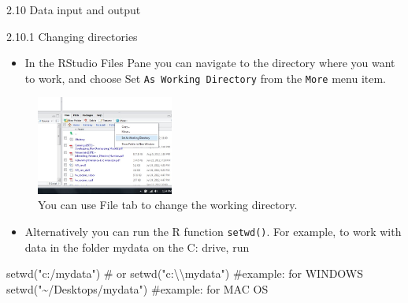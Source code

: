 \documentclass[
  9pt,
  a4paper,
  ignorenonframetext,
  notheorems]{beamer}
\newenvironment{Shaded}{\begin{snugshade}}{\end{snugshade}}
\newcommand{\CommentTok}[1]{\textcolor[rgb]{0.37,0.37,0.37}{#1}}
\newcommand{\FunctionTok}[1]{\textcolor[rgb]{0.28,0.35,0.67}{#1}}
\newcommand{\NormalTok}[1]{\textcolor[rgb]{0.00,0.23,0.31}{#1}}
\newcommand{\StringTok}[1]{\textcolor[rgb]{0.13,0.47,0.30}{#1}}
\providecommand{\tightlist}{%
  \setlength{\itemsep}{0pt}\setlength{\parskip}{0pt}}\usepackage{longtable,booktabs,array}
\begin{document}
\begin{frame}[fragile]{2.10 Data input and output}
\protect\hypertarget{data-input-and-output}{}
\begin{block}{2.10.1 Changing directories}
\protect\hypertarget{changing-directories}{}
\begin{itemize}
\tightlist
\item
  In the RStudio Files Pane you can navigate to the directory where you
  want to work, and choose Set \texttt{As\ Working\ Directory} from the
  \texttt{More} menu item.
\end{itemize}

\begin{figure}

{\centering \includegraphics[width=0.4\textwidth,height=\textheight]{images/setasworkingdirectory.jpeg}

}

\caption{You can use File tab to change the working directory.}

\end{figure}

\begin{itemize}
\tightlist
\item
  Alternatively you can run the R function \texttt{setwd()}. For
  example, to work with data in the folder mydata on the C: drive, run
\end{itemize}

\begin{Shaded}
\begin{Highlighting}[]
\FunctionTok{setwd}\NormalTok{(}\StringTok{"c:/mydata"}\NormalTok{) }\CommentTok{\# or setwd("c:\textbackslash{}\textbackslash{}mydata") \#example: for WINDOWS}
\FunctionTok{setwd}\NormalTok{(}\StringTok{"\textasciitilde{}/Desktops/mydata"}\NormalTok{) }\CommentTok{\#example: for MAC OS}
\end{Highlighting}
\end{Shaded}
\end{block}
\end{frame}
\end{document}
